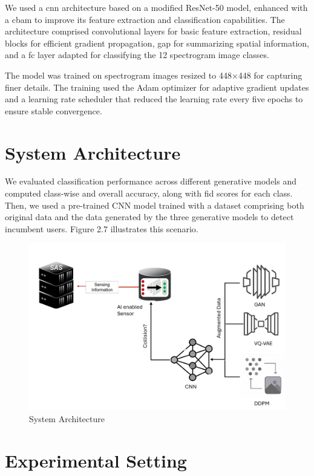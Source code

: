 We used a \gls{cnn} architecture based on a modified ResNet-50 model, enhanced with a \gls{cbam} to improve its feature extraction and classification capabilities. The architecture comprised convolutional layers for basic feature extraction, residual blocks for efficient gradient propagation, \gls{gap} for summarizing spatial information, and a \gls{fc} layer adapted for classifying the 12 spectrogram image classes.

The model was trained on spectrogram images resized to 448×448 for capturing finer details. The training used the Adam\cite{18} optimizer for adaptive gradient updates and a learning rate scheduler that reduced the learning rate every five epochs to ensure stable convergence.  

\section{System Architecture}

We evaluated classification performance across different generative models and computed class-wise and overall accuracy, along with \gls{fid} scores for each class. Then, we used a pre-trained CNN model trained with a dataset comprising both original data and the data generated by the three generative models to detect incumbent users. Figure 2.7 illustrates this scenario.
\begin{figure}[h]
\includegraphics[width=\textwidth]{figures/diagram_with_white_background.png}
\centering
\caption{ System Architecture}
\centering
\end{figure}

\section{Experimental Setting}
